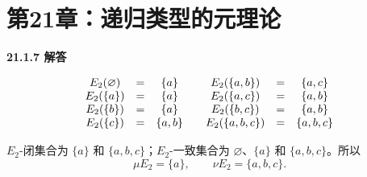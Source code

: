 \newpage
\section{第21章：递归类型的元理论}

\begin{taplauthorsolutionentrybox}
\label{sol:author:21.1.7}
\textbf{21.1.7 解答}

\[
\begin{array}{c@{\quad=\quad}c@{\qquad}c@{\quad=\quad}c}
E_2(\varnothing)&\{a\}&E_2(\{a,b\})&\{a,c\}\\
E_2(\{a\})&\{a\}&E_2(\{a,c\})&\{a,b\}\\
E_2(\{b\})&\{a\}&E_2(\{b,c\})&\{a,b\}\\
E_2(\{c\})&\{a,b\}&E_2(\{a,b,c\})&\{a,b,c\}
\end{array}
\]

\(E_2\)-闭集合为 \(\{a\}\) 和 \(\{a,b,c\}\)；\(E_2\)-一致集合为
\(\varnothing\)、\(\{a\}\) 和 \(\{a,b,c\}\)。所以
\[
\mu E_2=\{a\},\qquad \nu E_2=\{a,b,c\}.
\]

\end{taplauthorsolutionentrybox}

